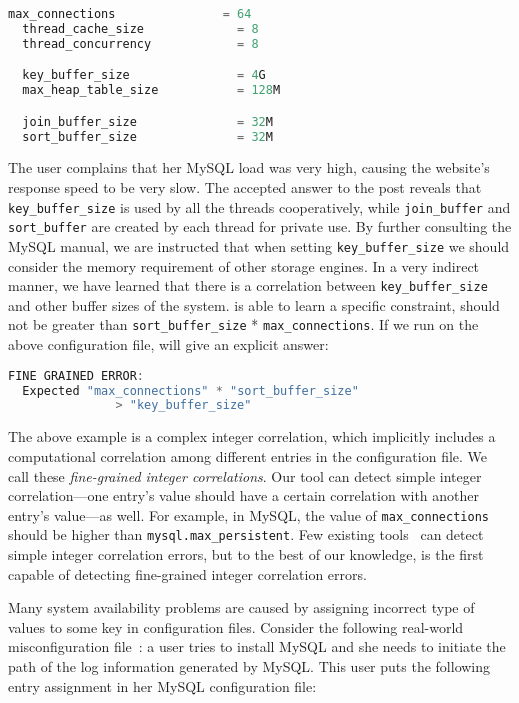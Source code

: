 \begin{lstlisting}[language=C, xleftmargin=.01\textwidth]
  max_connections               = 64
  thread_cache_size             = 8
  thread_concurrency            = 8

  key_buffer_size               = 4G
  max_heap_table_size           = 128M

  join_buffer_size              = 32M
  sort_buffer_size              = 32M    
\end{lstlisting} 

The user complains that her MySQL load was very high, causing the website's response speed to be very slow.
The accepted answer to the post reveals that {\tt key\_buffer\_size} is used by all the threads cooperatively, 
  while {\tt join\_buffer} and {\tt sort\_buffer} are created by each thread for private use.
By further consulting the MySQL manual, we are instructed that when setting {\tt key\_buffer\_size} we should consider the memory requirement of other storage engines.
In a very indirect manner, we have learned that there is a correlation between {\tt key\_buffer\_size} and other buffer sizes of the system.
\app is able to learn a specific constraint,  should not be greater than {\tt sort\_buffer\_size} * {\tt max\_connections}.
If we run \app on the above configuration file, \app will give an explicit answer:

\begin{lstlisting}[language=C, xleftmargin=.01\textwidth]
  FINE GRAINED ERROR:
  Expected "max_connections" * "sort_buffer_size"
               > "key_buffer_size"
\end{lstlisting} 

The above example is a complex integer correlation, which implicitly
includes a computational correlation among different entries
in the configuration file.
We call these {\em fine-grained integer correlations}. 
Our tool can detect simple integer correlation---one entry's
value should have a certain correlation with another entry's 
value---as well.
For example, in MySQL, the value of {\tt max\_connections} 
should be higher than {\tt mysql.max\_persistent}.
Few existing tools~\cite{yin11anempirical, zhang14encore}
can detect simple integer correlation errors,
but to the best of our knowledge, \app is the first capable of
detecting fine-grained integer correlation errors.

Many system availability problems are caused by 
assigning incorrect type of values to some key in configuration
files. Consider the following real-world misconfiguration
file~\cite{typeerror}:
a user tries to install MySQL and she needs to initiate the path
of the log information generated by MySQL.
This user puts the following entry assignment in her MySQL
configuration file: 

